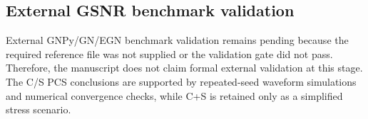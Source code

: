\subsection{External GSNR benchmark validation}
External GNPy/GN/EGN benchmark validation remains pending because the required reference file was not supplied or the validation gate did not pass.
Therefore, the manuscript does not claim formal external validation at this stage.
The C/S PCS conclusions are supported by repeated-seed waveform simulations and numerical convergence checks, while C+S is retained only as a simplified stress scenario.

